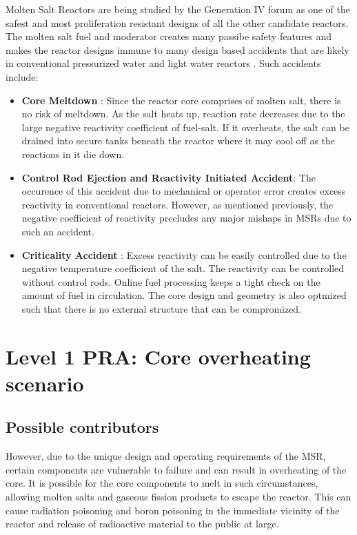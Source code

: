 \documentclass[12pt]{article}
\begin{document}
Molten Salt Reactors are being studied by the Generation IV forum as one of the safest and most proliferation resistant designs of all the other candidate reactors. The molten salt fuel and moderator creates many passibe safety features and makes the reactor designs immune to many design based accidents that are likely in conventional pressurized water and light water reactors \cite{elsheikh_safety_2013}. Such accidents include:
\begin{itemize}

\item \textbf{Core Meltdown} : Since the reactor core comprises of molten salt, there is no risk of meltdown. As the salt heats up, reaction rate decreases due to the large negative reactivity coefficient of fuel-salt. If it overheats, the salt can be drained into secure tanks beneath the reactor where it may cool off as the reactions in it die down.

\item \textbf{Control Rod Ejection and Reactivity Initiated Accident}: The occurence of this accident due to mechanical or operator error creates excess reactivity in conventional reactors. However, as mentioned previously, the negative coefficient of reactivity precludes any major mishaps in MSRs due to such an accident. 

\item \textbf{Criticality Accident} : Excess reactivity can be easily controlled due to the negative temperature coefficient of the salt. The reactivity can be controlled without control rods. Online fuel processing keeps a tight check on the amount of fuel in circulation. The core design and geometry is also optmized such that there is no external structure that can be compromized.

\end{itemize}

\section{Level 1 PRA: Core overheating scenario}

\subsection{Possible contributors}

However, due to the unique design and operating requirements of the MSR, certain components are vulnerable to failure and can result in overheating of the core. It is possible for the core components to melt in such circumstances, allowing molten salts and gaseous fission products to escape the reactor. This can cause radiation poisoning and boron poisoning in the immediate vicinity of the reactor and release of radioactive material to the public at large.
\end{document}
